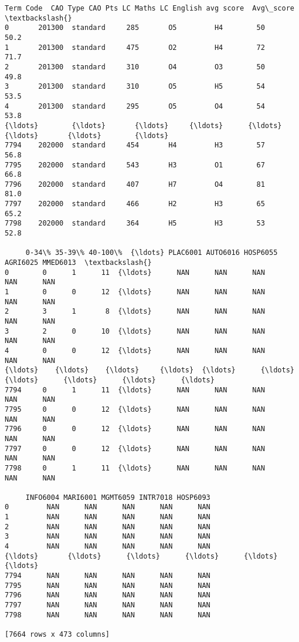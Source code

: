 \documentclass[11pt]{article}
\makeatletter
\newcommand{\boxspacing}{\kern\kvtcb@left@rule\kern\kvtcb@boxsep}
\newcommand{\prompt}[4]{
        \ttfamily\llap{{\color{#2}[#3]:\hspace{3pt}#4}}\vspace{-\baselineskip}
    }
\makeatother
\begin{document}
            \begin{tcolorbox}[breakable, size=fbox, boxrule=.5pt, pad at break*=1mm, opacityfill=0]
\prompt{Out}{outcolor}{18}{\boxspacing}
\begin{Verbatim}[commandchars=\\\{\}]
     Term Code  CAO Type CAO Pts LC Maths LC English avg score  Avg\_score  \textbackslash{}
0       201300  standard     285       O5         H4        50       50.2
1       201300  standard     475       O2         H4        72       71.7
2       201300  standard     310       O4         O3        50       49.8
3       201300  standard     310       O5         H5        54       53.5
4       201300  standard     295       O5         O4        54       53.8
{\ldots}        {\ldots}       {\ldots}     {\ldots}      {\ldots}        {\ldots}       {\ldots}        {\ldots}
7794    202000  standard     454       H4         H3        57       56.8
7795    202000  standard     543       H3         O1        67       66.8
7796    202000  standard     407       H7         O4        81       81.0
7797    202000  standard     466       H2         H3        65       65.2
7798    202000  standard     364       H5         H3        53       52.8

     0-34\% 35-39\% 40-100\%  {\ldots} PLAC6001 AUTO6016 HOSP6055 AGRI6025 MMED6013  \textbackslash{}
0        0      1      11  {\ldots}      NAN      NAN      NAN      NAN      NAN
1        0      0      12  {\ldots}      NAN      NAN      NAN      NAN      NAN
2        3      1       8  {\ldots}      NAN      NAN      NAN      NAN      NAN
3        2      0      10  {\ldots}      NAN      NAN      NAN      NAN      NAN
4        0      0      12  {\ldots}      NAN      NAN      NAN      NAN      NAN
{\ldots}    {\ldots}    {\ldots}     {\ldots}  {\ldots}      {\ldots}      {\ldots}      {\ldots}      {\ldots}      {\ldots}
7794     0      1      11  {\ldots}      NAN      NAN      NAN      NAN      NAN
7795     0      0      12  {\ldots}      NAN      NAN      NAN      NAN      NAN
7796     0      0      12  {\ldots}      NAN      NAN      NAN      NAN      NAN
7797     0      0      12  {\ldots}      NAN      NAN      NAN      NAN      NAN
7798     0      1      11  {\ldots}      NAN      NAN      NAN      NAN      NAN

     INFO6004 MARI6001 MGMT6059 INTR7018 HOSP6093
0         NAN      NAN      NAN      NAN      NAN
1         NAN      NAN      NAN      NAN      NAN
2         NAN      NAN      NAN      NAN      NAN
3         NAN      NAN      NAN      NAN      NAN
4         NAN      NAN      NAN      NAN      NAN
{\ldots}       {\ldots}      {\ldots}      {\ldots}      {\ldots}      {\ldots}
7794      NAN      NAN      NAN      NAN      NAN
7795      NAN      NAN      NAN      NAN      NAN
7796      NAN      NAN      NAN      NAN      NAN
7797      NAN      NAN      NAN      NAN      NAN
7798      NAN      NAN      NAN      NAN      NAN

[7664 rows x 473 columns]
\end{Verbatim}
\end{tcolorbox}
        
\end{document}

